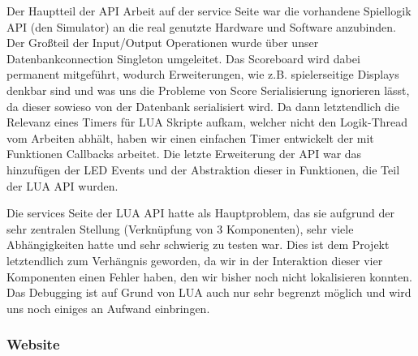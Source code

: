 Der Hauptteil der API Arbeit auf der service Seite war die vorhandene Spiellogik API (den Simulator) an die real genutzte Hardware und Software anzubinden. Der Großteil der Input/Output Operationen wurde über unser Datenbankconnection Singleton umgeleitet. Das Scoreboard wird dabei permanent mitgeführt, wodurch Erweiterungen, wie z.B. spielerseitige Displays denkbar sind und was uns die Probleme von Score Serialisierung ignorieren lässt, da dieser sowieso von der Datenbank serialisiert wird. Da dann letztendlich die Relevanz eines Timers für LUA Skripte aufkam, welcher nicht den Logik-Thread vom Arbeiten abhält, haben wir einen einfachen Timer entwickelt der mit Funktionen Callbacks arbeitet. Die letzte Erweiterung der API war das hinzufügen der LED Events und der Abstraktion dieser in Funktionen, die Teil der LUA API wurden.

Die services Seite der LUA API hatte als Hauptproblem, das sie aufgrund der sehr zentralen Stellung (Verknüpfung von 3 Komponenten), sehr viele Abhängigkeiten hatte und sehr schwierig zu testen war. Dies ist dem Projekt letztendlich zum Verhängnis geworden, da wir in der Interaktion dieser vier Komponenten einen Fehler haben, den wir bisher noch nicht lokalisieren konnten. Das Debugging ist auf Grund von LUA auch nur sehr begrenzt möglich und wird uns noch einiges an Aufwand einbringen.

\subsubsection{Website}

